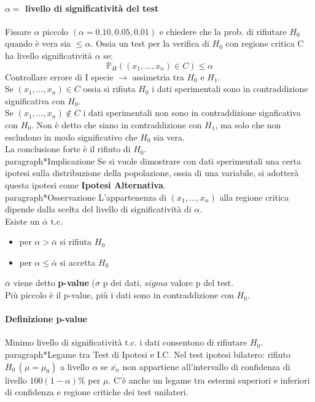 \paragraph*{$\alpha =$ livello di significatività del test} Fissare $\alpha$ piccolo
$(\alpha = 0.10, 0.05, 0.01)$ e chiedere che la prob. di rifiutare $H_0$ quando è
vera sia $\leq \alpha$. Ossia un test per la verifica di $H_0$ con regione critica C
ha livello significatività $\alpha$ se:
\begin{equation}
    \mathbb{P}_H((x_1, ..., x_n)\in C) \leq \alpha
\end{equation}
Controllare errore di I specie $\rightarrow$ assimetria tra $H_0$ e $H_1$.
\\ Se $(x_1, ..., x_n) \in C$ ossia si rifiuta $H_0$ i dati sperimentali sono
in contraddizione significativa con $H_0$.
\\ Se $(x_1, ..., x_n) \notin C$ i dati sperimentali non sono
in contraddizione signficativa con $H_0$.
Non è detto che siano in contraddizione con $H_1$, ma solo che non escludono
in modo significativo che $H_0$ sia vera.
\\ La conclusione forte è il rifiuto di $H_0$.
\\paragraph*{Implicazione} Se si vuole dimostrare con dati sperimentali una certa ipotesi
sulla distribuzione della popolazione, ossia di una variabile, si adotterà questa
ipotesi come \textbf{Ipotesi Alternativa}.
\\paragraph*{Osservazione} L'appartenenza di $(x_1, ..., x_n)$ alla regione
critica dipende dalla scelta del livello di significatività di $\alpha$.
\\ Esiste un $\bar{\alpha}$ t.c.
\begin{itemize}
    \item per $\alpha > \bar{\alpha}$ si rifiuta $H_0$
    \item per $\alpha \leq \bar{\alpha}$ si accetta $H_0$
\end{itemize}
$\bar{\alpha}$ viene detto \textbf{p-value} ($\sigma$ p dei dati, $sigma$ valore p
del test.
\\ Più piccolo è il p-value, più i dati sono in contraddizione con $H_0$.
\paragraph*{Definizione p-value} Minimo livello di significatività t.c. i dati
consentono di rifiutare $H_0$.
\\paragraph*{Legame tra Test di Ipotesi e I.C.}
Nel test ipotesi bilatero: rifiuto $H_0 \, (\mu=\mu_0)$ a livello $\alpha$ se $\bar{x_n}$
non appartiene all'intervallo di confidenza di livello $100(1-\alpha)\%$ per $\mu$.
C'è anche un legame tra estermi superiori e inferiori di confidenza e regione critiche dei
test unilateri.
